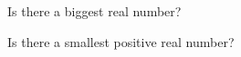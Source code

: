 \begin{question}
 \item Is there a biggest real number?
 \item Is there a smallest positive real number?
 \end{question}
 